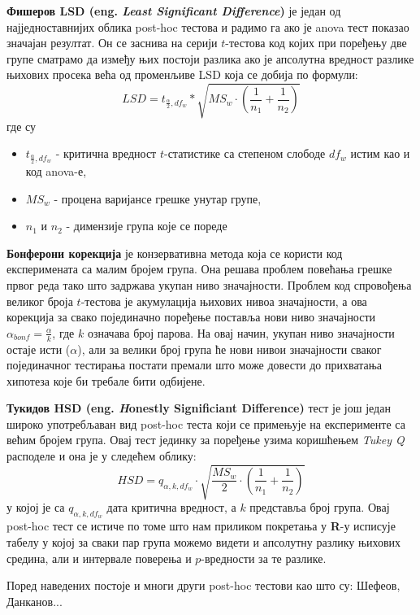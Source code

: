 \documentclass[12pt, a4paper]{article}
\begin{document}
\par \textbf{Фишеров LSD (eng. \textit{Least Significant Difference})} је један од најједноставнијих облика post-hoc 
тестова и радимо га ако је anova тест показао значајан резултат.
Он се заснива на серији $t$-тестова код којих при поређењу две групе сматрамо да између њих
постоји разлика ако је апсолутна вредност разлике њихових просека већа од променљиве LSD
која се добија по формули:
$$LSD=t_{\frac{\alpha}{2},df_w}*\sqrt{MS_w\cdot(\frac{1}{n_1}+\frac{1}{n_2})}$$ 
где су \begin{itemize} 
    \item $t_{\frac{\alpha}{2},df_w}$ - критична вредност $t$-статистике са степеном слободе 
    $df_w$ истим као и код anova-е, 
    \item $MS_w$ - процена варијансе грешке унутар групе, 
    \item $n_1$ и $n_2$ - димензије група које се пореде
\end{itemize}

\par \textbf{Бонферони корекција} је конзервативна метода која се користи код експеримената са малим бројем 
група. Она решава проблем повећања грешке првог реда тако што задржава укупан ниво значајности.
Проблем код спровођења великог броја $t$-тестова је акумулација њихових нивоа значајности, а ова 
корекција за свако појединачно поређење поставља нови ниво значајности 
$\alpha_{bonf}=\frac{\alpha}{k}$, где $k$ означава број парова. На овај начин, укупан ниво значајности 
остаје исти ($\alpha$), али за велики број група ће нови нивои значајности сваког појединачног 
тестирања постати премали што може довести до прихватања хипотеза које би требале бити одбијене.

\par 
\textbf{Тукидов HSD (eng. \textit Honestly Significiant Difference)} тест је још један широко употребљаван вид post-hoc теста који се примењује на експерименте са већим бројем група.
Овај тест јединку за поређење узима коришћењем \textit{Tukey Q} расподеле и она је у следећем 
облику:
$$HSD=q_{\alpha,k,df_w}\cdot\sqrt{\frac{MS_w}{2}\cdot(\frac{1}{n_1}+\frac{1}{n_2})}$$ 
у којој је са $q_{\alpha,k,df_w}$ дата критична вредност, а $k$ представља број група.
Овај post-hoc тест се истиче по томе што нам приликом покретања у \textbf{R}-у исписује табелу у 
којој за сваки пар група можемо видети и апсолутну разлику њихових средина, али и интервале 
поверења и $p$-вредности за те разлике.

Поред наведених постоје и многи други post-hoc тестови као што су: Шефеов, Данканов... 
\end{document}
